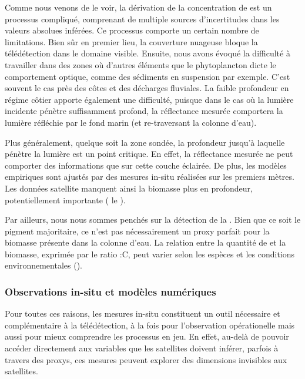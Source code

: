 Comme nous venons de le voir, la dérivation de la concentration de  est un processus compliqué, comprenant de multiple sources d'incertitudes dans les valeurs absolues inférées.
Ce processus comporte un certain nombre de limitations.
Bien sûr en premier lieu, la couverture nuageuse bloque la télédétection dans le domaine visible.
Ensuite, nous avons évoqué la difficulté à travailler dans des zones où d'autres éléments que le phytoplancton dicte le comportement optique, comme des sédiments en suspension par exemple.
C'est souvent le cas près des côtes et des décharges fluviales.
La faible profondeur en régime côtier apporte également une difficulté, puisque dans le cas où la lumière incidente pénètre suffisamment profond, la réflectance mesurée comportera la lumière réfléchie par le fond marin (et re-traversant la colonne d'eau).

Plus généralement, quelque soit la zone sondée, la profondeur jusqu'à laquelle pénètre la lumière est un point critique.
En effet, la réflectance mesurée ne peut comporter des informations que sur cette couche éclairée.
De plus, les modèles empiriques sont ajustés par des mesures in-situ réalisées sur les premiers mètres.
Les données satellite manquent ainsi la biomasse plus en profondeur, potentiellement importante ( le ).

Par ailleurs, nous nous sommes penchés sur la détection de la . Bien que ce soit le pigment majoritaire, ce n'est pas nécessairement un proxy parfait pour la biomasse présente dans la colonne d'eau.
La relation entre la quantité de  et la biomasse, exprimée par le ratio \hbox{:C}, peut varier selon les espèces et les conditions environnementales (\cite{behrenfeld_2015,halsey_2015,inomura_2022}).


\subsubsection{Observations in-situ et modèles numériques}

Pour toutes ces raisons, les mesures in-situ constituent un outil nécessaire et complémentaire à la télédétection, à la fois pour l'observation opérationelle mais aussi pour mieux comprendre les processus en jeu.
En effet, au-delà de pouvoir accéder directement aux variables que les satellites doivent inférer, parfois à travers des proxys, ces mesures peuvent explorer des dimensions invisibles aux satellites.

